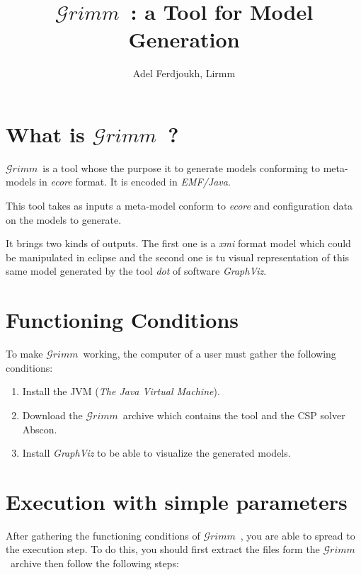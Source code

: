 \documentclass[12pt]{article} %
\newcommand{\grimm}{$\mathcal{G}rimm$\ }
\begin{document}
\title{\grimm: a Tool for Model Generation}
\author{Adel Ferdjoukh, Lirmm}
\date{}


\maketitle

\vspace{5cm}

\tableofcontents

\newpage

\section{What is \grimm ?}

\grimm is a tool whose the purpose it to generate models conforming to meta-models in \textit{ecore} format. It is encoded in \textit{EMF/Java}.

This tool takes as inputs a meta-model conform to \textit{ecore} and configuration data on the models to generate.

It brings two kinds of outputs. The first one is a \textit{xmi} format model which could be manipulated in eclipse and the second one is tu visual representation of this same model generated by the tool \textit{dot} of software \textit{GraphViz}.


\section{Functioning Conditions}

To make \grimm working, the computer of a user must gather the following conditions:

\begin{enumerate}
\item Install the JVM (\textit{The Java Virtual Machine}).
\item Download the \grimm archive which contains the tool and the CSP solver Abscon.
\item Install \textit{GraphViz} to be able to visualize the generated models.
\end{enumerate}

\section{Execution with simple parameters}

After gathering the functioning conditions of \grimm, you are able to spread to the execution step. To do this, you should first extract the files form the \grimm archive then follow the following steps: 
\end{document}
